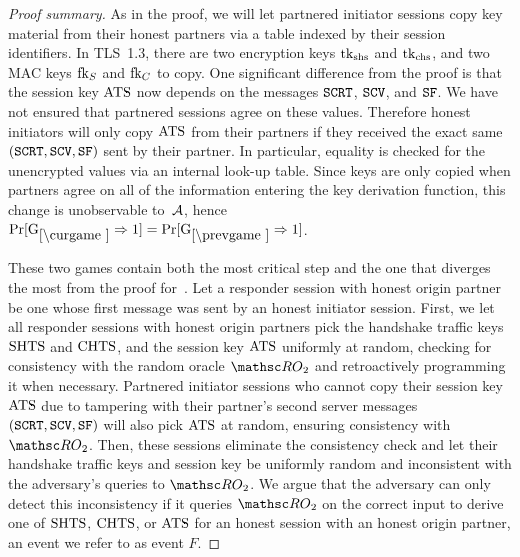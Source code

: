 \begin{proof}[Proof summary]

As in the \SIGMAI proof, we will let partnered initiator sessions copy key material from their honest partners via a table indexed by their session identifiers.
In TLS~1.3, there are two encryption keys $\mathrm{tk}_{\text{shs}}$ and $\mathrm{tk}_{\text{chs}}$, and two MAC keys $\mathrm{fk}_S$ and $\mathrm{fk}_C$ to copy. One significant difference from the \SIGMAI proof is that the session key $\mathrm{ATS}$ now depends on the messages $\mathtt{SCRT}$, $\mathtt{SCV}$, and $\mathtt{SF}$. We have not ensured that partnered sessions agree on these values. Therefore honest initiators will only copy $\mathrm{ATS}$ from their partners if they received the exact same $(\mathtt{SCRT},\allowbreak \mathtt{SCV},\allowbreak \mathtt{SF})$ sent by their partner. In particular, equality is checked for the unencrypted values via an internal look-up table. 
Since keys are only copied when partners agree on all of the information entering the key derivation function, this change is unobservable to~$\mathcal{A}$, hence
$\Pr[\curGm*\Rightarrow 1] = \Pr[\prevGm*\Rightarrow 1]$.



These two games contain both the most critical step and the one that diverges the most from the proof for~\SIGMAI.
Let a responder session with honest origin partner be one whose first message was sent by an honest initiator session. 
First, we let all responder sessions with honest origin partners pick the handshake traffic keys $\mathrm{SHTS}$ and $\mathrm{CHTS}$, and the session key $\mathrm{ATS}$ uniformly at random, checking for consistency with the random oracle $\RO_2$ and retroactively programming it when necessary. 
Partnered initiator sessions who cannot copy their session key $\mathrm{ATS}$ due to tampering with their partner's second server messages $(\mathtt{SCRT},\allowbreak \mathtt{SCV},\allowbreak \mathtt{SF})$ will also pick $\mathrm{ATS}$ at random, ensuring consistency with~$\RO_2$.
Then, these sessions eliminate the consistency check and let their handshake traffic keys and session key be uniformly random and inconsistent with the adversary's queries to $\RO_2$. 
We argue that the adversary can only detect this inconsistency if it queries $\RO_2$ on the correct input to derive one of $\mathrm{SHTS}$, $\mathrm{CHTS}$, or $\mathrm{ATS}$ for an honest session with an honest origin partner, an event we refer to as event $F$. 


\end{proof}
